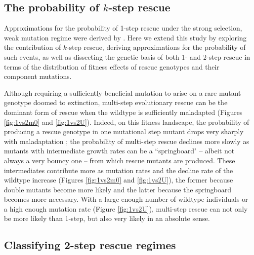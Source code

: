\documentclass[9pt,twocolumn,twoside,lineno]{gsajnl}
\begin{document}
\subsection{The probability of $k$-step rescue}

Approximations for the probability of 1-step rescue under the strong selection, weak mutation regime were derived by \cite{Anciaux2018}.  
Here we extend this study by exploring the contribution of $k$-step rescue, deriving approximations for the probability of such events, as well as dissecting the genetic basis of both 1- and 2-step rescue in terms of the distribution of fitness effects of rescue genotypes and their component mutations.

Although requiring a sufficiently beneficial mutation to arise on a rare mutant genotype doomed to extinction, multi-step evolutionary rescue can be the dominant form of rescue when the wildtype is sufficiently maladapted (Figures \ref{fig:1vs2m0} and \ref{fig:1vs2U}). 
Indeed, on this fitness landscape, the probability of producing a rescue genotype in one mutational step mutant drops very sharply with maladaptation \citep{Anciaux2018}; the probability of multi-step rescue declines more slowly as mutants with intermediate growth rates can be a ``springboard" -- albeit not always a very bouncy one -- from which rescue mutants are produced. 
These intermediates contribute more as mutation rates and the decline rate of the wildtype increase (Figures \ref{fig:1vs2m0} and \ref{fig:1vs2U}), the former because double mutants become more likely and the latter because the springboard becomes more necessary.
With a large enough number of wildtype individuals or a high enough mutation rate (Figure \ref{fig:1vs2U}), multi-step rescue can not only be more likely than 1-step, but also very likely in an absolute sense.

\subsection{Classifying 2-step rescue regimes}
\end{document}
